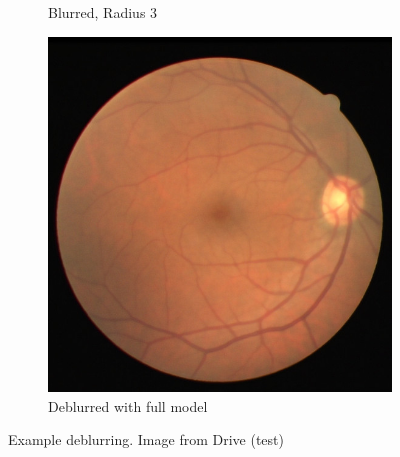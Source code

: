 \documentclass{scrartcl}
\begin{document}
\begin{figure}[htb]
\begin{subfigure}{0.33\textwidth}
    \caption{Blurred, Radius 3}
\end{subfigure}%
\begin{subfigure}{0.33\textwidth}
\centering
    \includegraphics[width=1.0\textwidth]{deblur_gan}
    \caption{Deblurred with full model}
\end{subfigure}

\caption{Example deblurring. Image from Drive (test)~\cite{Drive}}
\label{fig:deblurring-example}
\end{figure}
\end{document}
